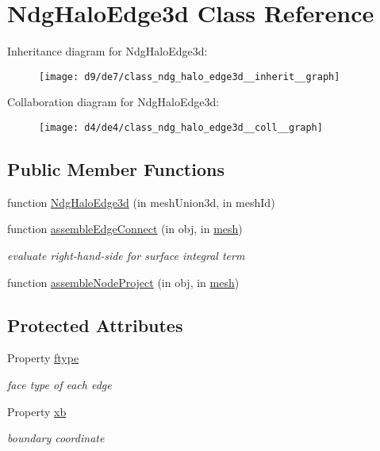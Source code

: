 \hypertarget{class_ndg_halo_edge3d}{}\section{Ndg\+Halo\+Edge3d Class Reference}
\label{class_ndg_halo_edge3d}


Inheritance diagram for Ndg\+Halo\+Edge3d\+:
\nopagebreak
\begin{figure}[H]
\begin{center}
\leavevmode
\texttt{[image: d9/de7/class\_ndg\_halo\_edge3d\_\_inherit\_\_graph]}
\end{center}
\end{figure}


Collaboration diagram for Ndg\+Halo\+Edge3d\+:
\nopagebreak
\begin{figure}[H]
\begin{center}
\leavevmode
\texttt{[image: d4/de4/class\_ndg\_halo\_edge3d\_\_coll\_\_graph]}
\end{center}
\end{figure}
\subsection*{Public Member Functions}
\begin{DoxyCompactItemize}
\item 
function \hyperlink{class_ndg_halo_edge3d_a75d09d99957f9e6b22185287ad8f8499}{Ndg\+Halo\+Edge3d} (in mesh\+Union3d, in mesh\+Id)
\item 
function \hyperlink{class_ndg_halo_edge3d_ab470f0dc5e5308add91fb7362e5d02d7}{assemble\+Edge\+Connect} (in obj, in \hyperlink{class_ndg_side_edge3d_a60de04f2f3079b24be4de0e1cab6e116}{mesh})
\begin{DoxyCompactList}\small\item\em evaluate right-\/hand-\/side for surface integral term \end{DoxyCompactList}\item 
function \hyperlink{class_ndg_halo_edge3d_a89ca09eead5f8eacb7c9d649320a9d7f}{assemble\+Node\+Project} (in obj, in \hyperlink{class_ndg_side_edge3d_a60de04f2f3079b24be4de0e1cab6e116}{mesh})
\end{DoxyCompactItemize}
\subsection*{Protected Attributes}
\begin{DoxyCompactItemize}
\item 
Property \hyperlink{class_ndg_halo_edge3d_afaa805ea2b8553aff8e7086e89b5fd0f}{ftype}
\begin{DoxyCompactList}\small\item\em face type of each edge \end{DoxyCompactList}\item 
Property \hyperlink{class_ndg_halo_edge3d_ad5cd5cdb5b00bdcf3879301fbf971c8a}{xb}
\begin{DoxyCompactList}\small\item\em boundary coordinate \end{DoxyCompactList}\end{DoxyCompactItemize}


